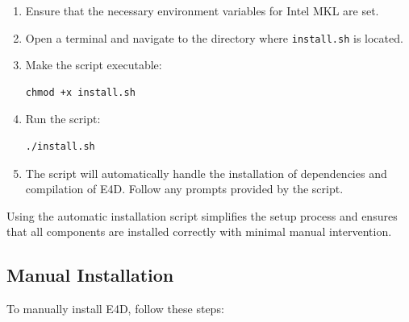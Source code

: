 \documentclass[a4paper,12pt]{article}
\begin{document}
\begin{enumerate}
    \item Ensure that the necessary environment variables for Intel MKL are set.
    \item Open a terminal and navigate to the directory where \texttt{install.sh} is located.
    \item Make the script executable:
    \begin{verbatim}
chmod +x install.sh
    \end{verbatim}
    \item Run the script:
    \begin{verbatim}
./install.sh
    \end{verbatim}
    \item The script will automatically handle the installation of dependencies and compilation of E4D. Follow any prompts provided by the script.
\end{enumerate}

Using the automatic installation script simplifies the setup process and ensures that all components are installed correctly with minimal manual intervention.

\subsection{Manual Installation}

To manually install E4D, follow these steps:
\end{document}
